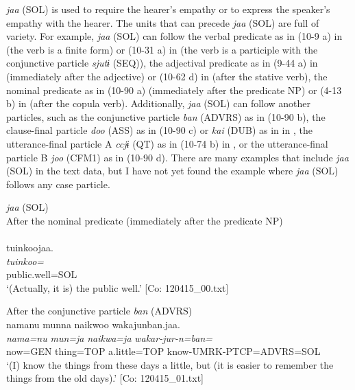 \textit{jaa} (SOL) is used to require the hearer’s empathy or to express the speaker’s empathy with the hearer. The units that can precede \textit{jaa} (SOL) are full of variety. For example, \textit{jaa} (SOL) can follow the verbal predicate as in (10-9 a) in  (the verb is a finite form) or (10-31 a) in  (the verb is a participle with the conjunctive particle \textit{sjutɨ} (SEQ)), the adjectival predicate as in (9-44 a) in  (immediately after the adjective) or (10-62 d) in  (after the stative verb), the nominal predicate as in (10-90 a) (immediately after the predicate NP) or (4-13 b) in  (after the copula verb). Additionally, \textit{jaa} (SOL) can follow another particles, such as the conjunctive particle \textit{ban} (ADVRS) as in (10-90 b), the clause-final particle \textit{doo} (ASS) as in (10-90 c) or \textit{kai} (DUB) as in  in , the utterance-final particle A \textit{ccjɨ} (QT) as in (10-74 b) in , or the utterance-final particle B \textit{joo} (CFM1) as in (10-90 d). There are many examples that include \textit{jaa} (SOL) in the text data, but I have not yet found the example where \textit{jaa} (SOL) follows any case particle.

\ea\label{ex:10.90}   \textit{jaa} (SOL)\\
  \ea After the nominal predicate (immediately after the predicate NP)\\\\
      \glll    tuinkoojaa.\\
    \textit{tuinkoo=}\\
    public.well=SOL\\
  \glt     ‘(Actually, it is) the public well.’ [Co: 120415\_00.txt]

  \ex After the conjunctive particle \textit{ban} (ADVRS)\\
      \glll    namanu  munna  naikwoo  wakajunban.jaa.\\
    \textit{nama=nu}  \textit{mun=ja}  \textit{naikwa=ja}  \textit{wakar-jur-n=ban=}\\
    now=GEN  thing=TOP  a.little=TOP  know-UMRK-PTCP=ADVRS=SOL\\
  \glt     ‘(I) know the things from these days a little, but (it is easier to remember the things from the old days).’ [Co: 120415\_01.txt]

